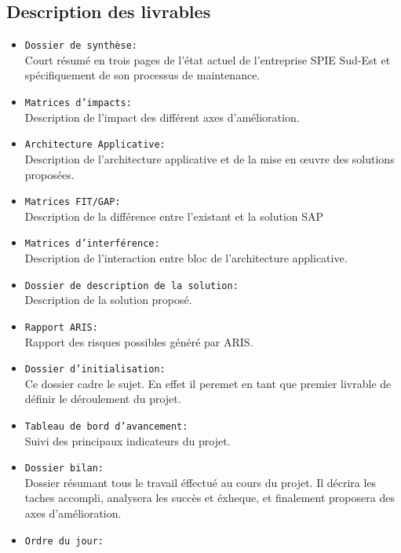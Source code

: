 \documentclass[]{scrartcl}
\begin{document}
\begin{itemize}
\subsection{Description des livrables}
\begin{itemize}
\item  \texttt{Dossier de synthèse:}\\ Court résumé en trois pages de l'état actuel de l'entreprise SPIE Sud-Est et spécifiquement de son processus de maintenance.
\item  \texttt{Matrices d'impacts:}\\ Description de l'impact des différent axes d'amélioration.
\item  \texttt{Architecture Applicative:}\\ Description de l'architecture applicative et de la mise en œuvre des solutions proposées. 
\item  \texttt{Matrices FIT/GAP:}\\ Description de la différence entre l'existant et la solution SAP
\item \texttt{Matrices d'interférence:}\\ Description de l'interaction entre bloc de l'architecture applicative. 
\item  \texttt{Dossier de description de la solution:}\\ Description de la solution proposé. 
\item  \texttt{Rapport ARIS:}\\  Rapport des risques possibles généré par ARIS.
\\
\item  \texttt{Dossier d'initialisation:}\\ Ce dossier cadre le sujet. En effet il peremet en tant que premier livrable de définir le déroulement du projet. 
\item  \texttt{Tableau de bord d'avancement:} \\ Suivi des principaux indicateurs du projet.
\item  \texttt{Dossier bilan:}\\ Dossier résumant tous le travail éffectué au cours du projet. Il décrira les taches accompli, analysera les succès et éxheque, et finalement proposera des axes d'amélioration.
\item \texttt{Ordre du jour:} \\
\end{itemize}




\end{itemize}
\end{document}
